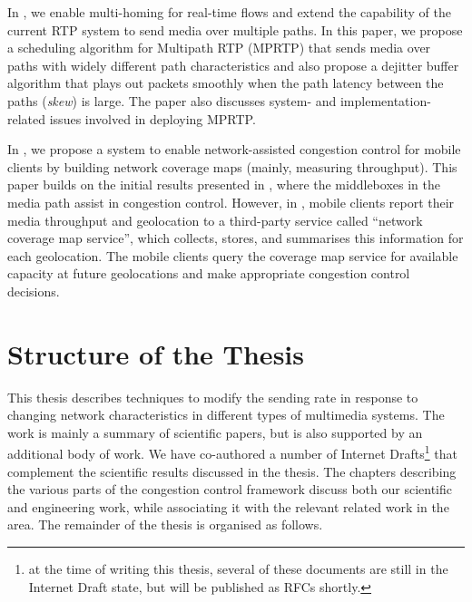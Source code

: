 In , we enable multi-homing for real-time flows and extend
the capability of the current RTP system to send media over multiple paths. In
this paper, we propose a scheduling algorithm for Multipath RTP (MPRTP) that
sends media over paths with widely different path characteristics and also
propose a dejitter buffer algorithm that plays out packets smoothly when the
path latency between the paths (\emph{skew}) is large. The paper also
discusses system- and implementation-related issues involved in deploying
MPRTP.

In , we propose a system to enable network-assisted
congestion control for mobile clients by building network coverage maps
(mainly, measuring throughput). This paper builds on the initial results
presented in , where the middleboxes in the media path assist
in congestion control. However, in , mobile clients report
their media throughput and geolocation to a third-party service called
``network coverage map service'', which collects, stores, and summarises this
information for each geolocation. The mobile clients query the coverage map
service for available capacity at future geolocations and make appropriate
congestion control decisions.

\section{Structure of the Thesis}

This thesis describes techniques to modify the sending rate in response to changing
network characteristics in different types of multimedia systems. The work is
mainly a summary of scientific papers, but is also supported by an additional
body of work. We have co-authored a number of Internet Drafts\footnote{at the
time of writing this thesis, several of these documents are still in the
Internet Draft state, but will be published as RFCs shortly.} that complement
the scientific results discussed in the thesis. The chapters describing the
various parts of the congestion control framework discuss both our scientific
and engineering work, while associating it with the relevant related work in
the area. The remainder of the thesis is organised as follows.


